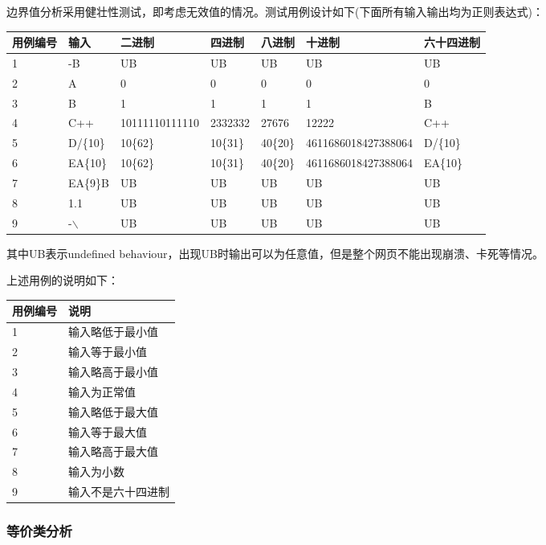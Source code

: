 \documentclass[12pt, a4paper, oneside]{ctexart}
\begin{document}
边界值分析采用健壮性测试，即考虑无效值的情况。测试用例设计如下(下面所有输入输出均为正则表达式)：
\begin{table}[!h]
    \small
    \begin{tabular}{|l|l|l|l|l|l|l|}
    \hline
    用例编号 & 输入 & 二进制 & 四进制 & 八进制 & 十进制 & 六十四进制\\ \hline
    1 & -B & UB & UB & UB & UB & UB \\ \hline
    2 & A & 0 & 0 & 0 & 0 & 0\\ \hline
    3 & B & 1 & 1 & 1 & 1 & B \\ \hline
    4 & C++ & 10111110111110 & 2332332 & 27676 & 12222 & C++ \\ \hline
    5 & D/\{10\} & 10\{62\} & 10\{31\} & 40\{20\} & 4611686018427388064 & D/\{10\}\\ \hline
    6 & EA\{10\} & 10\{62\} & 10\{31\} & 40\{20\} & 4611686018427388064 & EA\{10\}\\ \hline
    7 & EA\{9\}B & UB & UB & UB & UB & UB \\ \hline
    8 & 1.1 & UB & UB & UB & UB & UB\\ \hline
    9 & -$\backslash$ & UB & UB & UB & UB & UB\\ \hline
    \end{tabular}
\end{table}
其中UB表示undefined behaviour，出现UB时输出可以为任意值，但是整个网页不能出现崩溃、卡死等情况。


上述用例的说明如下：
\begin{table}[!h]
    \begin{tabular}{|l|l|}
    \hline
    用例编号 & 说明\\ \hline
    1 & 输入略低于最小值\\ \hline
    2 & 输入等于最小值\\ \hline
    3 & 输入略高于最小值 \\ \hline
    4 & 输入为正常值 \\ \hline   
    5 & 输入略低于最大值\\ \hline
    6 & 输入等于最大值 \\ \hline
    7 & 输入略高于最大值 \\ \hline
    8 & 输入为小数 \\ \hline
    9 & 输入不是六十四进制 \\ \hline
    \end{tabular}
\end{table}

\subsubsection{等价类分析}
\end{document}

